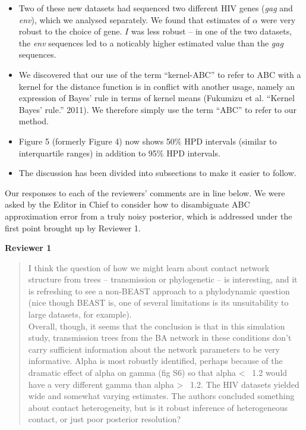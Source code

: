\documentclass[12pt]{letter}
\begin{document}
\begin{letter}{ }
\begin{itemize}
  \item Two of these new datasets had sequenced two different HIV genes
    (\textit{gag} and \textit{env}), which we analysed separately. We found
    that estimates of $\alpha$ were very robust to the choice of gene. $I$ was
    less robust -- in one of the two datasets, the \textit{env} sequences led
    to a noticably higher estimated value than the \textit{gag} sequences.
  \item We discovered that our use of the term ``kernel-ABC'' to refer to ABC 
    with a kernel for the distance function is in conflict with another usage,
    namely an expression of Bayes' rule in terms of kernel means (Fukumizu et
    al. ``Kernel Bayes' rule.'' 2011). We therefore simply use the term ``ABC''
    to refer to our method.
  \item Figure 5 (formerly Figure 4) now shows 50\% HPD intervals (similar to
    interquartile ranges) in addition to 95\% HPD intervals.
  \item The discussion has been divided into subsections to make it easier to
    follow.
\end{itemize}

Our responses to each of the reviewers' comments are in line below. We were
asked by the Editor in Chief to consider how to disambiguate ABC approximation
error from a truly noisy posterior, which is addressed under the first point
brought up by Reviewer 1.

\textbf{Reviewer 1}

\begin{quote}
  \itshape

  I think the question of how we might learn about contact network structure
  from trees -- transmission or phylogenetic -- is interesting, and it is
  refreshing to see a non-BEAST approach to a phylodynamic question (nice
  though BEAST is, one of several limitations is its unsuitability to large
  datasets, for example). \\

  Overall, though, it seems that the conclusion is that in this simulation
  study, transmission trees from the BA network in these conditions don't carry
  sufficient information about the network parameters to be very informative.
  Alpha is most robustly identified, perhaps because of the dramatic effect of
  alpha on gamma (fig S6) so that alpha < ~1.2 would have a very different
  gamma than alpha > ~1.2. The HIV datasets yielded wide and somewhat varying
  estimates. The authors concluded something about contact heterogeneity, but
  is it robust inference of heterogeneous contact, or just poor posterior
  resolution?
\end{quote}


\end{letter}
\end{document}
